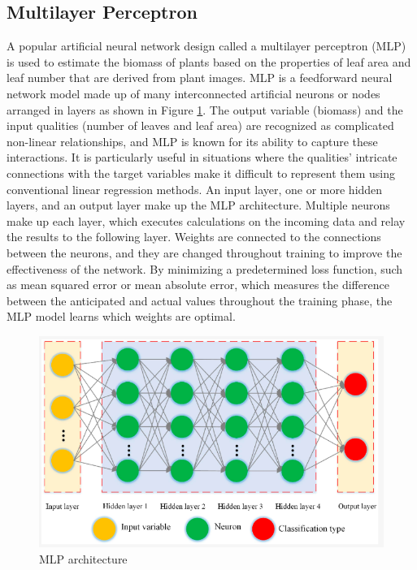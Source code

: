 \documentclass[a4paper,12pt]{report}%
\renewcommand{\\}{\vspace*{0.5\baselineskip} \newline}
\begin{document}
\subsection{ Multilayer Perceptron}
A popular artificial neural network design called a multilayer perceptron (MLP) is used to estimate the biomass of plants based on the properties of leaf area and leaf number that are derived from plant images. MLP is a feedforward neural network model made up of many interconnected artificial neurons or nodes arranged in layers as shown in Figure \ref{MLP architecture}.
The output variable (biomass) and the input qualities (number of leaves and leaf area) are recognized as complicated non-linear relationships, and MLP is known for its ability to capture these interactions. It is particularly useful in situations where the qualities' intricate connections with the target variables make it difficult to represent them using conventional linear regression methods.
An input layer, one or more hidden layers, and an output layer make up the MLP architecture. Multiple neurons make up each layer, which executes calculations on the incoming data and relay the results to the following layer. Weights are connected to the connections between the neurons, and they are changed throughout training to improve the effectiveness of the network.
By minimizing a predetermined loss function, such as mean squared error or mean absolute error, which measures the difference between the anticipated and actual values throughout the training phase, the MLP model learns which weights are optimal. 

\begin{figure}[h]
\centering
	\includegraphics[scale=0.95]{images/mlp.png}\\
	\begin{footnotesize}
		\caption{MLP architecture \cite{29}}
		\label{MLP architecture}
	\end{footnotesize}
\end{figure}
\end{document}

